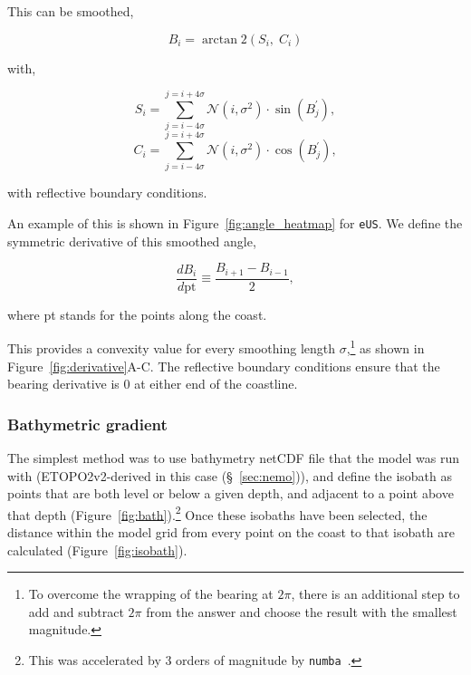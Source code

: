 This can be smoothed,

\begin{equation}
B_i=\operatorname{arctan} 2
\left(S_i,\; C_i\right)
\label{eq:bearing}
\end{equation}

with,

\begin{equation}
S_i = \sum_{j=i-4\sigma}^{j=i+4\sigma} \mathcal{N}(i, \sigma^{2})\cdot \sin{( B_{j}^{\prime})},
\end{equation}
\begin{equation}
C_i  =  \sum_{j=i-4\sigma}^{j=i+4\sigma} \mathcal{N}(i, \sigma^{2})\cdot  \cos{( B_{j}^{\prime})},
\end{equation}

with reflective boundary conditions.

An example of this is shown in Figure~\ref{fig:angle_heatmap} for \texttt{eUS}.
We define the symmetric derivative of this smoothed angle,

\begin{equation}
\frac{d B_i}{d \mathrm{pt}}
\equiv \frac{B_{i+1}-B_{i-1}}{2},
\label{eq:bearing_derivative}
\end{equation}

where pt stands for the points along the coast.

This provides a convexity value for every smoothing length $\sigma$,\footnote{
To overcome the wrapping of the bearing at $2\pi$,
there is an additional step to add and subtract $2\pi$ from the
answer and choose the result with the smallest magnitude.
} as shown in Figure~\ref{fig:derivative}A-C. The reflective boundary conditions
ensure that the bearing derivative is 0 at either end of the coastline.





\subsubsection{Bathymetric gradient}
\label{sec:bath-grad}
The simplest method was to use
bathymetry netCDF file that the model was run with (ETOPO2v2-derived in this
 case (§~\ref{sec:nemo})), and define the isobath as
 points that are both level or below a given depth,
  and adjacent to a point above that depth (Figure~\ref{fig:bath}).\footnote{This was accelerated by 3 orders of magnitude by \texttt{numba}~\cite{lam2015numba}.}
Once these isobaths have been selected, the distance
within the model grid from every point on
the coast to that isobath are calculated (Figure~\ref{fig:isobath}).

